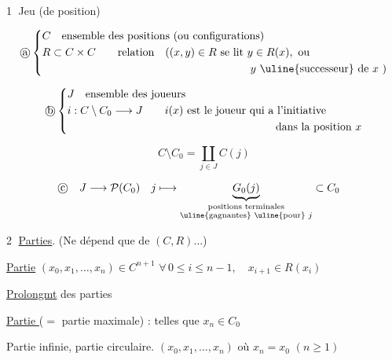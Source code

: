 \textcircled{1} Jeu (de position)

\[
\text{\textcircled{a}}\left\{\begin{aligned}
&C\quad\text{ensemble des positions (ou configurations)}\\
&R\subset C\times C\qquad\text{relation}\quad ((x,y)\in R\ \text{se lit }y\in R(x),\ \text{ou}\\
&\hspace{19em}y\ \text{\uline{successeur} de }x\ )
\end{aligned}\right.
\]


\[
\text{\textcircled{b}}\left\{\begin{aligned}
&J\quad\text{ensemble des joueurs}\\
&i:C\setminus C_0\longrightarrow J\qquad i(x)\ \text{est}\ \text{le joueur qui a l'initiative}\\
&\hspace{19em}\text{dans la position }x
\end{aligned}\right.
\]

\[
C\setminus C_0=\coprod_{j\in J} C(j)
\]

\[
\begin{aligned}
\text{\textcircled{c}}\quad J&\longrightarrow\mathcal P(C_0)&
j&\longmapsto\underbrace{G_0(j)}_{\substack{\text{positions terminales}\\\text{\uline{gagnantes} \uline{pour} }j}}\subset C_0
\end{aligned}
\]

\textcircled{2} \uline{Parties}.  (Ne dépend que de $(C,R)\ldots$)

\uline{Partie}  $(x_0,x_1,\ldots,x_n)\in C^{n+1}$ \qquad $\forall\,0\leq i\leq n-1,\quad x_{i+1}\in R(x_i)$

\uline{Prolongmt} des parties

\uline{Partie } ($=$ partie maximale) : telles que $x_n\in C_0$

Partie infinie, partie circulaire. \quad $(x_0,x_1,\ldots,x_n)$ \quad où $x_n=x_0$ \quad $(n\geq1)$

